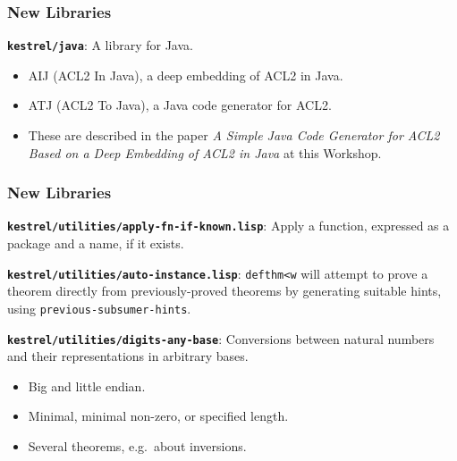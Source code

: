 \documentclass{beamer}
\newcommand{\code}[1]{\texttt{#1}}
\newcommand{\bookpath}[1]{\textbf{\code{#1}}}
\newcommand{\newlibtitle}{\frametitle{New Libraries}}
\newcommand{\separation}{\vspace*{1ex}}
\begin{document}

\begin{frame}

\newlibtitle

\separation

\bookpath{kestrel/java}:
A library for Java.
\begin{itemize}
\item
AIJ (ACL2 In Java), a deep embedding of ACL2 in Java.
\item
ATJ (ACL2 To Java), a Java code generator for ACL2.
\item
These are described in the paper
\textit{A Simple Java Code Generator for ACL2
Based on a Deep Embedding of ACL2 in Java}
at this Workshop.
\end{itemize}

\end{frame}


\begin{frame}

\newlibtitle

\bookpath{kestrel/utilities/apply-fn-if-known.lisp}:
Apply a function, expressed as a package and a name, if it exists.

\separation

\bookpath{kestrel/utilities/auto-instance.lisp}:
\code{defthm<w} will attempt to prove a theorem directly
from previously-proved theorems by generating
suitable hints, using \code{previous-subsumer-hints}.

\separation

\bookpath{kestrel/utilities/digits-any-base}:
Conversions between natural numbers
and their representations in arbitrary bases.
\begin{itemize}
\item
Big and little endian.
\item
Minimal, minimal non-zero, or specified length.
\item
Several theorems, e.g.\ about inversions.
\end{itemize}

\end{frame}

\end{document}
